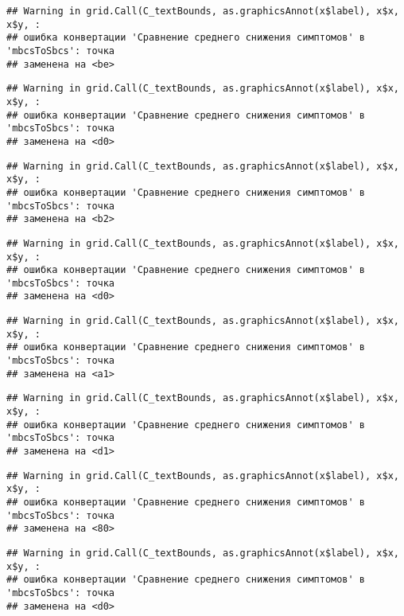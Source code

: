 \documentclass[
]{article}
\begin{document}
\begin{verbatim}
## Warning in grid.Call(C_textBounds, as.graphicsAnnot(x$label), x$x, x$y, :
## ошибка конвертации 'Сравнение среднего снижения симптомов' в 'mbcsToSbcs': точка
## заменена на <be>
\end{verbatim}

\begin{verbatim}
## Warning in grid.Call(C_textBounds, as.graphicsAnnot(x$label), x$x, x$y, :
## ошибка конвертации 'Сравнение среднего снижения симптомов' в 'mbcsToSbcs': точка
## заменена на <d0>
\end{verbatim}

\begin{verbatim}
## Warning in grid.Call(C_textBounds, as.graphicsAnnot(x$label), x$x, x$y, :
## ошибка конвертации 'Сравнение среднего снижения симптомов' в 'mbcsToSbcs': точка
## заменена на <b2>
\end{verbatim}

\begin{verbatim}
## Warning in grid.Call(C_textBounds, as.graphicsAnnot(x$label), x$x, x$y, :
## ошибка конвертации 'Сравнение среднего снижения симптомов' в 'mbcsToSbcs': точка
## заменена на <d0>
\end{verbatim}

\begin{verbatim}
## Warning in grid.Call(C_textBounds, as.graphicsAnnot(x$label), x$x, x$y, :
## ошибка конвертации 'Сравнение среднего снижения симптомов' в 'mbcsToSbcs': точка
## заменена на <a1>
\end{verbatim}

\begin{verbatim}
## Warning in grid.Call(C_textBounds, as.graphicsAnnot(x$label), x$x, x$y, :
## ошибка конвертации 'Сравнение среднего снижения симптомов' в 'mbcsToSbcs': точка
## заменена на <d1>
\end{verbatim}

\begin{verbatim}
## Warning in grid.Call(C_textBounds, as.graphicsAnnot(x$label), x$x, x$y, :
## ошибка конвертации 'Сравнение среднего снижения симптомов' в 'mbcsToSbcs': точка
## заменена на <80>
\end{verbatim}

\begin{verbatim}
## Warning in grid.Call(C_textBounds, as.graphicsAnnot(x$label), x$x, x$y, :
## ошибка конвертации 'Сравнение среднего снижения симптомов' в 'mbcsToSbcs': точка
## заменена на <d0>
\end{verbatim}
\end{document}
